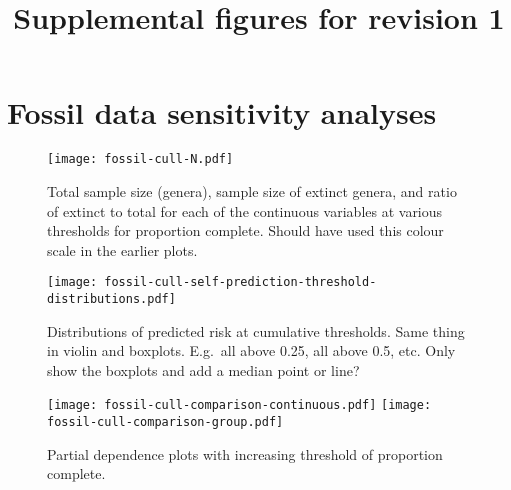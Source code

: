 \documentclass[11pt]{article}
\title{Supplemental figures for revision 1}
\author{}
\begin{document}
\maketitle

\section{Fossil data sensitivity analyses}



\begin{figure}[htbp]
\begin{center}
\texttt{[image: fossil-cull-N.pdf]}
\caption{Total sample size (genera), sample size of extinct genera, and ratio of extinct to total for each of the continuous variables at various thresholds for proportion complete. Should have used this colour scale in the earlier plots.}
\label{fig:raw-predictor-paleo-culls}
\end{center}
\end{figure}

\clearpage



\begin{figure}[htbp]
\begin{center}
\texttt{[image: fossil-cull-self-prediction-threshold-distributions.pdf]}
\caption{Distributions of predicted risk at cumulative thresholds. Same thing in violin and boxplots. E.g.\ all above 0.25, all above 0.5, etc. Only show the boxplots and add a median point or line?}
\label{fig:ext-boxplots-paleo-culls}
\end{center}
\end{figure}

\clearpage

\begin{figure}[htbp]
\begin{center}
\texttt{[image: fossil-cull-comparison-continuous.pdf]}
\texttt{[image: fossil-cull-comparison-group.pdf]}
\caption{Partial dependence plots with increasing threshold of proportion complete.}
\label{fig:partial-paleo-culls}
\end{center}
\end{figure}
\end{document}
